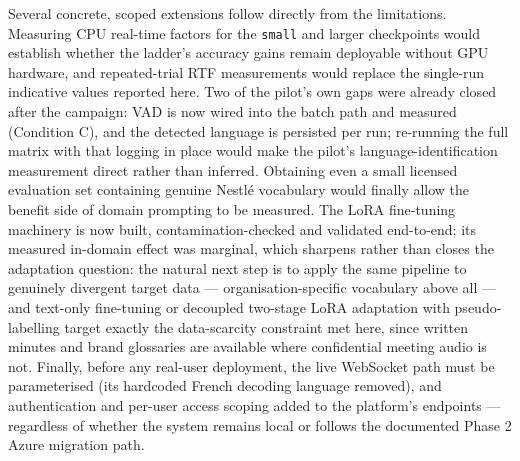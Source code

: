 \documentclass[12pt]{report}
\begin{document}
Several concrete, scoped extensions follow directly from the limitations. Measuring CPU real-time factors for the \texttt{small} and larger checkpoints would establish whether the ladder's accuracy gains remain deployable without GPU hardware, and repeated-trial RTF measurements would replace the single-run indicative values reported here. Two of the pilot's own gaps were already closed after the campaign: VAD is now wired into the batch path and measured (Condition C), and the detected language is persisted per run; re-running the full matrix with that logging in place would make the pilot's language-identification measurement direct rather than inferred. Obtaining even a small licensed evaluation set containing genuine Nestl\'e vocabulary would finally allow the benefit side of domain prompting to be measured. The LoRA fine-tuning machinery is now built, contamination-checked and validated end-to-end; its measured in-domain effect was marginal, which sharpens rather than closes the adaptation question: the natural next step is to apply the same pipeline to genuinely divergent target data --- organisation-specific vocabulary above all --- and text-only fine-tuning \cite{fang2025textonly} or decoupled two-stage LoRA adaptation with pseudo-labelling \cite{zheng2026twostage} target exactly the data-scarcity constraint met here, since written minutes and brand glossaries are available where confidential meeting audio is not. Finally, before any real-user deployment, the live WebSocket path must be parameterised (its hardcoded French decoding language removed), and authentication and per-user access scoping added to the platform's endpoints --- regardless of whether the system remains local or follows the documented Phase 2 Azure migration path.

\renewcommand{\cftchappresnum}{\chaptername~}
\renewcommand{\cftchapnumwidth}{6em}

\cleardoublepage
\printbibliography[heading=subbibliography,
                    title={\textsc{Bibliography}}]
\thispagestyle{fancy}

\newpage
\tableofcontents
\thispagestyle{fancy}
\end{document}
